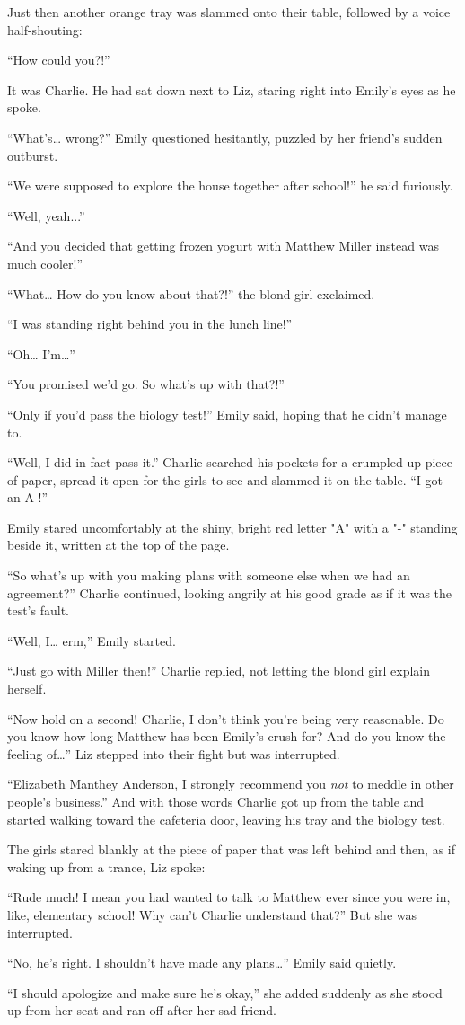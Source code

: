 Just then another orange tray was slammed onto their table, followed by a voice half-shouting:

“How could you?!”

It was Charlie. He had sat down next to Liz, staring right into Emily’s eyes as he spoke.

“What’s… wrong?” Emily questioned hesitantly, puzzled by her friend’s sudden outburst.

“We were supposed to explore the house together after school!” he said furiously.

“Well, yeah...”

“And you decided that getting frozen yogurt with Matthew Miller instead was much cooler!”

“What… How do you know about that?!” the blond girl exclaimed.

“I was standing right behind you in the lunch line!”

“Oh… I’m…”

“You promised we’d go. So what’s up with that?!”

“Only if you’d pass the biology test!” Emily said, hoping that he didn’t manage to.

“Well, I did in fact pass it.” Charlie searched his pockets for a crumpled up piece of paper, spread it open for the girls to see and slammed it on the table. “I got an A-!”

Emily stared uncomfortably at the shiny, bright red letter "A" with a "-" standing beside it, written at the top of the page.

“So what’s up with you making plans with someone else when we had an agreement?” Charlie continued, looking angrily at his good grade as if it was the test’s fault.

“Well, I… erm,” Emily started.

“Just go with Miller then!” Charlie replied, not letting the blond girl explain herself.

“Now hold on a second! Charlie, I don’t think you’re being very reasonable. Do you know how long Matthew has been Emily’s crush for? And do you know the feeling of…” Liz stepped into their fight but was interrupted.

“Elizabeth Manthey Anderson, I strongly recommend you \textit{not} to meddle in other people’s business.” And with those words Charlie got up from the table and started walking toward the cafeteria door, leaving his tray and the biology test.

The girls stared blankly at the piece of paper that was left behind and then, as if waking up from a trance, Liz spoke:

“Rude much! I mean you had wanted to talk to Matthew ever since you were in, like, elementary school! Why can’t Charlie understand that?” But she was interrupted.

“No, he’s right. I shouldn’t have made any plans…” Emily said quietly.

“I should apologize and make sure he’s okay,” she added suddenly as she stood up from her seat and ran off after her sad friend.